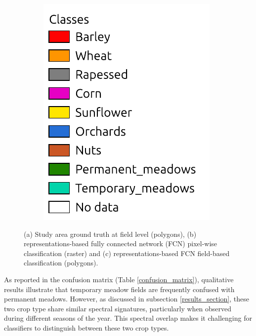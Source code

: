 \documentclass[journal,article,submit,pdftex,moreauthors]{Definitions/mdpi}
\begin{document}
\begin{figure}[H]
\begin{subfigure}[t]{0.15\linewidth}
    \includegraphics[width=\textwidth]{figures/aes_1_layer_mse_results/labels.pdf}
	\end{subfigure}
	\caption{(a) Study area ground truth at field level (polygons), (b) representations-based fully connected network (FCN) pixel-wise classification (raster) and (c) representations-based FCN field-based classification (polygons).}
	\label{fig:maps}
\end{figure}

As reported in the confusion matrix (Table \ref{confusion_matrix}), qualitative results illustrate that temporary meadow fields are frequently confused with permanent meadows. However, as discussed in subsection \ref{results_section}, these two crop type share similar spectral signatures, particularly when observed during different seasons of the year. This spectral overlap makes it challenging for classifiers to distinguish between these two crop types. 
\end{document}
